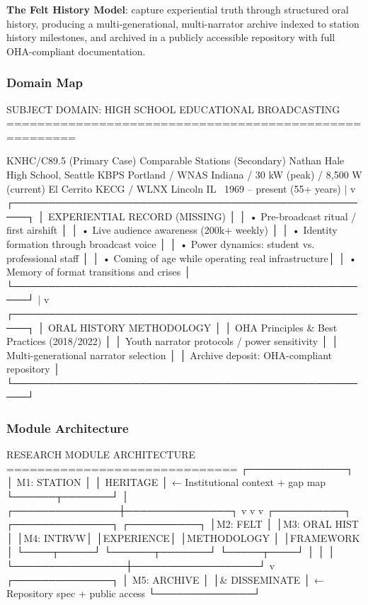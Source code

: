 \documentclass[11pt,letterpaper]{article}
\begin{document}
\textbf{The Felt History Model}: capture experiential truth through structured oral history, producing a multi-generational, multi-narrator archive indexed to station history milestones, and archived in a publicly accessible repository with full OHA-compliant documentation.

\subsubsection{Domain Map}

\begin{asciibox}
SUBJECT DOMAIN: HIGH SCHOOL EDUCATIONAL BROADCASTING
=======================================================

 KNHC/C89.5 (Primary Case)         Comparable Stations (Secondary)
 Nathan Hale High School, Seattle   KBPS Portland / WNAS Indiana /
 30 kW (peak) / 8,500 W (current)   El Cerrito KECG / WLNX Lincoln IL
 ~1969 -- present (55+ years)
             |
             v
 ┌────────────────────────────────────────────────────┐
 │           EXPERIENTIAL RECORD (MISSING)            │
 │  • Pre-broadcast ritual / first airshift           │
 │  • Live audience awareness (200k+ weekly)          │
 │  • Identity formation through broadcast voice      │
 │  • Power dynamics: student vs. professional staff  │
 │  • Coming of age while operating real infrastructure│
 │  • Memory of format transitions and crises         │
 └────────────────────────────────────────────────────┘
             |
             v
 ┌────────────────────────────────────────────────────┐
 │           ORAL HISTORY METHODOLOGY                 │
 │  OHA Principles & Best Practices (2018/2022)       │
 │  Youth narrator protocols / power sensitivity      │
 │  Multi-generational narrator selection             │
 │  Archive deposit: OHA-compliant repository         │
 └────────────────────────────────────────────────────┘
\end{asciibox}

\subsubsection{Module Architecture}

\begin{asciibox}
RESEARCH MODULE ARCHITECTURE
==============================
                    ┌──────────────┐
                    │  M1: STATION │
                    │  HERITAGE    │  ← Institutional context + gap map
                    └──────┬───────┘
                           │
           ┌───────────────┼───────────────┐
           v               v               v
    ┌──────────┐   ┌──────────────┐   ┌──────────┐
    │M2: FELT  │   │M3: ORAL HIST │   │M4: INTRVW│
    │EXPERIENCE│   │METHODOLOGY   │   │FRAMEWORK │
    └────┬─────┘   └──────┬───────┘   └─────┬────┘
         │                │                  │
         └────────────────┼──────────────────┘
                          v
                   ┌──────────────┐
                   │ M5: ARCHIVE  │
                   │& DISSEMINATE │  ← Repository spec + public access
                   └──────────────┘
\end{asciibox}
\end{document}
